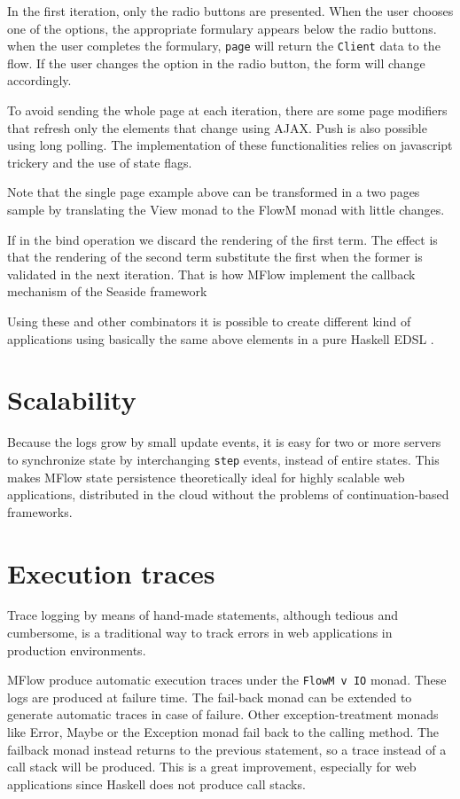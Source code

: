 \documentclass{tmr}
\begin{document}
In the first iteration, only the radio buttons are presented. When the user chooses one of the options, the appropriate formulary appears below the radio buttons. when the user completes the formulary, {\tt page} will return the {\tt Client} data to the flow. If the user changes the option in the radio button, the form will change accordingly. 
 
To avoid sending the whole page at each iteration, there are some page modifiers that refresh only the elements that change using AJAX. Push is also possible using long polling. The implementation of these functionalities relies on javascript trickery and the use of state flags. 
 
Note that the single page example above can be transformed in a two pages sample by translating the View monad to the FlowM monad with little changes. 
 
If in the bind operation we discard the rendering of the first term. The effect is that the rendering of the second term substitute the first when the former is validated in the next iteration. That is how MFlow implement the callback mechanism of the Seaside framework \cite{seasidecallback}

Using these and other combinators it is possible to create different kind of applications using basically the same above elements in a pure Haskell EDSL \cite{auth:mflowdsl}.
 
\section{Scalability} 
 
Because the logs grow by small update events, it is easy for two or more servers to synchronize state by interchanging {\tt step} events, instead of entire states. This makes MFlow state persistence theoretically ideal for highly scalable web applications, distributed in the cloud without the problems of continuation-based frameworks. 
 
 
 
 
\section{Execution traces} 
 
Trace logging by means of hand-made statements, although tedious and cumbersome, is a traditional way to track errors in web applications in production environments.
 
MFlow produce automatic execution traces under the {\tt FlowM v IO} 
monad. These logs are produced at failure time. The fail-back monad can be extended to generate  automatic traces in case of failure. Other exception-treatment monads like Error, Maybe or the Exception monad  fail back to the calling method. The failback monad instead returns to the previous statement, so  a trace instead of a call stack will be produced. This is a great improvement, especially for web applications since Haskell does not produce call stacks. 
\end{document}
